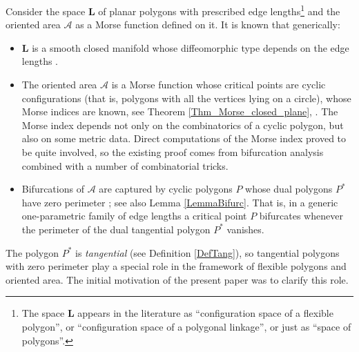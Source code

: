 \documentclass[12pt]{amsart}
\theoremstyle{plain}
\theoremstyle{definition}
\theoremstyle{remark}
\theoremstyle{plain}
\theoremstyle{definition}
\begin{document}
  Consider the space $\mathbf{L}$ of planar polygons with prescribed edge lengths\footnote{The space $\mathbf{L}$ appears in the literature as ``configuration space of a flexible polygon'', or ``configuration space of a polygonal linkage'', or just as ``space of polygons''.}  and the oriented area $\mathcal{A}$  as a Morse function  defined on it.
  It is known that  generically:
  \begin{itemize}
    \item $\mathbf{L}$  is a smooth closed manifold whose diffeomorphic type depends on the edge lengths \cite{Farber, MilKap}.
    \item  The oriented area $\mathcal{A}$ is a Morse function whose critical points are cyclic configurations (that is, polygons with all the vertices lying on a circle), whose Morse indices are known, see Theorem \ref{Thm_Morse_closed_plane}, \cite{khipan,panzh, zhu}. The Morse index depends not only on the combinatorics of a cyclic polygon, but also on some metric data. Direct computations of the Morse index proved to be quite involved, so the existing proof  comes from bifurcation analysis combined with a number of combinatorial tricks.
    \item Bifurcations of $\mathcal{A}$ are captured by  cyclic polygons $P$ whose dual polygons $P^*$ have zero perimeter \cite{panzh}; see also Lemma \ref{LemmaBifurc}. That is, in a generic one-parametric family of edge lengths a critical point $P$ bifurcates whenever the perimeter of the dual tangential polygon $P^*$  vanishes.
  \end{itemize}
The polygon $P^*$ is \textit{tangential} (see Definition \ref{DefTang}),  so tangential polygons with zero perimeter play a special role in the framework of flexible polygons and oriented area. The initial motivation of the present paper was to clarify
this role.
\end{document}
